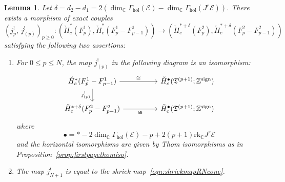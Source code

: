 \documentclass[a4paper]{amsart}
\newcommand{\bZ}{\mathbb Z}
\newcommand{\bC}{\mathbb C}
\newcommand{\cE}{\mathcal E}
\newcommand{\fT}{\mathfrak T}
\newcommand{\lra}{\longrightarrow}
\theoremstyle{plain}
\newtheorem{lemma}[theorem]{Lemma}
\theoremstyle{definition}
\newcommand{\CCH}{\check{H}_{c}}
\newcommand{\Gammahol}{\Gamma_{\mathrm{hol}}}
\newcommand{\rank}{\mathrm{rk}}
\begin{document}
\begin{lemma}\label{lemma:constructingmorphismexactcouple}
Let $\delta = d_2 - d_1 = 2(\dim_\bC \Gammahol(\cE) - \dim_\bC \Gammahol(J^r\cE))$. There exists a morphism of exact couples
\[
    \left(j^!_p, \ j^!_{(p)} \right)_{p \geq 0} \colon \left(\CCH^*(F_p^1),  \CCH^*(F_p^1 - F_{p-1}^1)\right) \lra \left(\CCH^{*+\delta}(F_p^2),  \CCH^{*+\delta}(F_p^2 - F_{p-1}^2)\right)
\]
satisfying the following two assertions:
\begin{enumerate}
    \item For $0 \leq p \leq N$, the map $j^!_{(p)}$ in the following diagram is an isomorphism:
    \begin{equation}\label{eqn:thomisolemmamorphismSScommutes}
    \begin{tikzcd}
    \CCH^*(F_p^1 - F_{p-1}^1) \arrow[d, "j^!_{(p)}"'] \arrow[rr, "\cong"] &  & \CCH^{\bullet}(\fT^{(p+1)}; \bZ^\mathrm{sign}) \\
    \CCH^{*+\delta}(F_p^2 - F_{p-1}^2) \arrow[rr, "\cong"']               &  & \CCH^{\bullet}(\fT^{(p+1)}; \bZ^\mathrm{sign})
    \end{tikzcd}
    \end{equation}
    where
    \[
        \bullet = * -2\dim_\bC \Gammahol(\cE) - p + 2(p+1)\rank_\bC J^r\cE
    \]
    and the horizontal isomorphisms are given by Thom isomorphisms as in Proposition~\ref{prop:firstpagethomiso}.

    \item The map $j^!_{N+1}$ is equal to the shriek map~\eqref{eqn:shriekmapRNcone}.
\end{enumerate}
\end{lemma}
\end{document}

